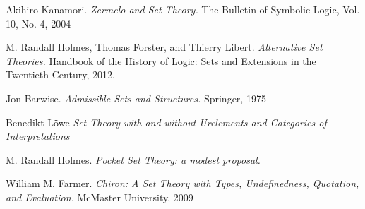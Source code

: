 \documentclass[12pt]{article}
\begin{document}
\begin{thebibliography}{9}
Akihiro Kanamori.
\textit{Zermelo and Set Theory.}
The Bulletin of Symbolic Logic, Vol. 10, No. 4, 2004

M. Randall Holmes, Thomas Forster, and Thierry Libert.
\textit{Alternative Set Theories.}
Handbook of the History of Logic: Sets and Extensions in the Twentieth Century, 2012.

Jon Barwise.
\textit{Admissible Sets and Structures.}
Springer, 1975

Benedikt L\"owe
\textit{Set Theory with and without Urelements and Categories of Interpretations}

M. Randall Holmes.
\textit{Pocket Set Theory: a modest proposal.}


William M. Farmer.
\textit{Chiron: A Set Theory with Types,
Undefinedness, Quotation, and Evaluation.}
McMaster University, 2009

\end{thebibliography}
\end{document}
